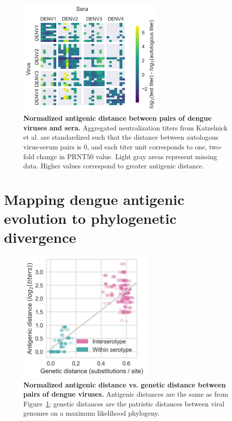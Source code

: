 \begin{figure}[h]
\begin{centering}
\includegraphics[width=0.65\textwidth]{./png/titer_heatmap.png}
    \caption{\textbf{Normalized antigenic distance between pairs of dengue viruses and sera.}
    Aggregated neutralization titers from Katzelnick et al. are standardized such that the distance between autologous virus-serum pairs is 0, and each titer unit corresponds to one, two-fold change in PRNT50 value.
    Light gray areas represent missing data.
    Higher values correspond to greater antigenic distance.
    }
     \label{titer_heatmap}
\end{centering}
\end{figure}

\section{Mapping dengue antigenic evolution to phylogenetic divergence}
\begin{figure}[h]
  \begin{centering}
  \includegraphics[width=0.6\textwidth]{./png/genetic_antigenic_distance.png}
  	\caption{\textbf{Normalized antigenic distance vs. genetic distance between pairs of dengue viruses.}
    Antigenic distances are the same as from Figure~\ref{titer_heatmap};
    genetic distances are the patristic distances between viral genomes on a maximum likelihood phylogeny.
    }
  	\label{genetic_antigenic_distance}
  \end{centering}
\end{figure}

